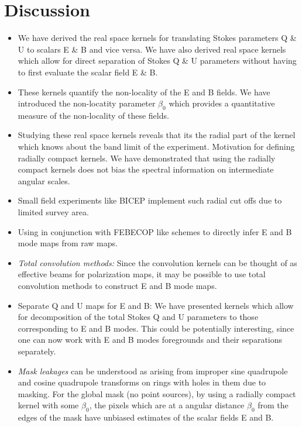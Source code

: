 \section{Discussion}\label{sec:discussion}
\begin{itemize}
\item We have derived the real space kernels for translating Stokes parameters Q \& U to scalars E \& B and vice versa. We have also derived real space kernels which allow for direct separation of Stokes Q \& U parameters without having to first evaluate the scalar field E \& B.

\item These kernels quantify the non-locality of the E and B fields. We have introduced the non-locatity parameter $\beta_0$ which provides a quantitative measure of the non-locality of these fields.  

\item Studying these real space kernels reveals that its the radial part of the kernel which knows about the band limit of the experiment. Motivation for defining radially compact kernels. We have demonstrated that using the radially compact kernels does not bias the spectral information on intermediate angular scales.

\item Small field experiments like BICEP implement such radial cut offs due to limited survey area. 


\item Using in conjunction with FEBECOP \cite{febecop} like schemes to directly infer E and B mode maps from raw maps.

\item \textit{Total convolution methods:} Since the convolution kernels can be thought of as effective beams for polarization maps, it may be possible to use total convolution methods to construct E and B mode maps.

\item{Separate Q and U maps for E and B:} We have presented kernels which allow for decomposition of the total Stokes Q and U parameters to those corresponding to E and B modes. This could be potentially interesting, since one can now work with E and B modes foregrounds and their separations separately. 

\item \textit{Mask leakages} can be understood as arising from improper sine quadrupole and cosine quadrupole transforms on rings with holes in them due to masking. For the global mask (no point sources), by using a radially compact kernel with some $\beta_0$, the pixels which are at a angular distance $\beta_0$ from the edges of the mask have unbiased estimates of the scalar fields E and B.


\end{itemize}

